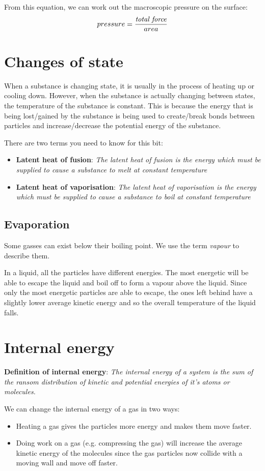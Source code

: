 \documentclass{article}
\begin{document}
From this equation, we can work out the macroscopic pressure on the surface:
\[
	pressure = \frac{\textrm{\textit{total force}}}{area}
\]

\section*{Changes of state}
When a substance is changing state, it is usually in the process of heating up or cooling down. However, when the substance is actually changing between states, the temperature of the substance is constant. This is because the energy that is being lost/gained by the substance is being used to create/break bonds between particles and increase/decrease the potential energy of the substance.

There are two terms you need to know for this bit:
\begin{itemize}
	\item \textbf{Latent heat of fusion}: \textit{The latent heat of fusion is the energy which must be supplied to cause a substance to melt at constant temperature}
	\item \textbf{Latent heat of vaporisation}: \textit{The latent heat of vaporisation is the energy which must be supplied to cause a substance to boil at constant temperature}
\end{itemize}
	
\subsection*{Evaporation}
Some gasses can exist below their boiling point. We use the term \textit{vapour} to describe them.

In a liquid, all the particles have different energies. The most energetic will be able to escape the liquid and boil off to form a vapour above the liquid. Since only the most energetic particles are able to escape, the ones left behind have a slightly lower average kinetic energy and so the overall temperature of the liquid falls.

\section*{Internal energy}
\textbf{Definition of internal energy}: \textit{The internal energy of a system is the sum of the ransom distribution of kinetic and potential energies of it's atoms or molecules.}

We can change the internal energy of a gas in two ways:
\begin{itemize}
	\item Heating a gas gives the particles more energy and makes them move faster.
	\item Doing work on a gas (e.g. compressing the gas) will increase the average kinetic energy of the molecules since the gas particles now collide with a moving wall and move off faster.
\end{itemize}
\end{document}
